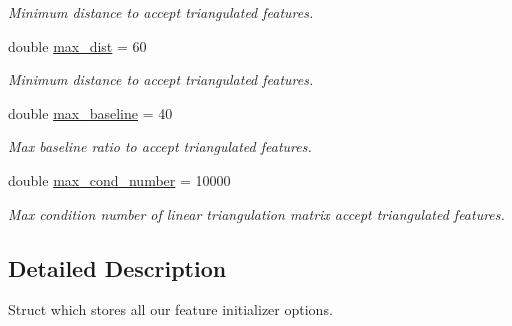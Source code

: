 \begin{DoxyCompactItemize}
\begin{DoxyCompactList}\small\item\em Minimum distance to accept triangulated features. \end{DoxyCompactList}\item 
\mbox{\label{structov__core_1_1FeatureInitializerOptions_ad1bf58514d4539e5722cd8f6bdfba543}} 
double \hyperlink{structov__core_1_1FeatureInitializerOptions_ad1bf58514d4539e5722cd8f6bdfba543}{max\+\_\+dist} = 60
\begin{DoxyCompactList}\small\item\em Minimum distance to accept triangulated features. \end{DoxyCompactList}\item 
\mbox{\label{structov__core_1_1FeatureInitializerOptions_a6f62408d17ff8e5ee4a76213f3348443}} 
double \hyperlink{structov__core_1_1FeatureInitializerOptions_a6f62408d17ff8e5ee4a76213f3348443}{max\+\_\+baseline} = 40
\begin{DoxyCompactList}\small\item\em Max baseline ratio to accept triangulated features. \end{DoxyCompactList}\item 
\mbox{\label{structov__core_1_1FeatureInitializerOptions_a3205f827e3ba58f509435d08b369995c}} 
double \hyperlink{structov__core_1_1FeatureInitializerOptions_a3205f827e3ba58f509435d08b369995c}{max\+\_\+cond\+\_\+number} = 10000
\begin{DoxyCompactList}\small\item\em Max condition number of linear triangulation matrix accept triangulated features. \end{DoxyCompactList}\end{DoxyCompactItemize}


\subsection{Detailed Description}
Struct which stores all our feature initializer options. 
